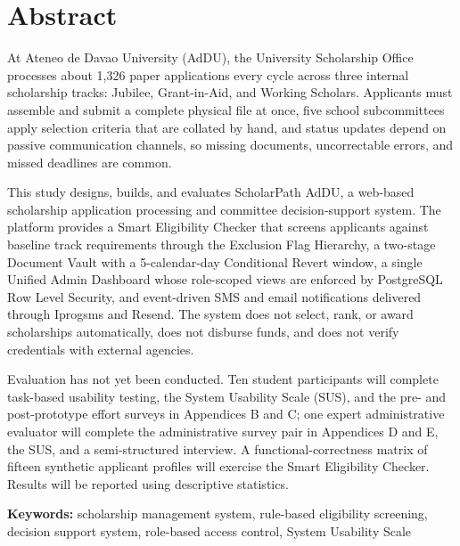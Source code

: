\setcounter{page}{2}

\chapter*{Abstract}

At Ateneo de Davao University (AdDU), the University Scholarship Office processes about 1,326 paper applications every cycle across three internal scholarship tracks: Jubilee, Grant-in-Aid, and Working Scholars. Applicants must assemble and submit a complete physical file at once, five school subcommittees apply selection criteria that are collated by hand, and status updates depend on passive communication channels, so missing documents, uncorrectable errors, and missed deadlines are common.

This study designs, builds, and evaluates ScholarPath AdDU, a web-based scholarship application processing and committee decision-support system. The platform provides a Smart Eligibility Checker that screens applicants against baseline track requirements through the Exclusion Flag Hierarchy, a two-stage Document Vault with a 5-calendar-day Conditional Revert window, a single Unified Admin Dashboard whose role-scoped views are enforced by PostgreSQL Row Level Security, and event-driven SMS and email notifications delivered through Iprogsms and Resend. The system does not select, rank, or award scholarships automatically, does not disburse funds, and does not verify credentials with external agencies.

Evaluation has not yet been conducted. Ten student participants will complete task-based usability testing, the System Usability Scale (SUS), and the pre- and post-prototype effort surveys in Appendices B and C; one expert administrative evaluator will complete the administrative survey pair in Appendices D and E, the SUS, and a semi-structured interview. A functional-correctness matrix of fifteen synthetic applicant profiles will exercise the Smart Eligibility Checker. Results will be reported using descriptive statistics.

\vspace{1em}
\noindent\textbf{Keywords:} scholarship management system, rule-based eligibility screening, decision support system, role-based access control, System Usability Scale

\cleardoublepage
\tableofcontents
\cleardoublepage
\listoftables
\cleardoublepage
\listoffigures
\cleardoublepage
{}
